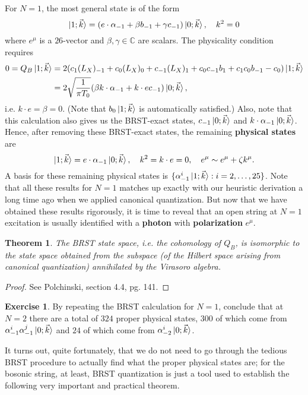 \documentclass{report}
\theoremstyle{plain}
\newtheorem{theorem}{Theorem}[section]
\theoremstyle{definition}
\newtheorem{exercise}{Exercise}[section]
\theoremstyle{remark}
\newcommand{\bC}{\mathbb{C}}
\begin{document}
For $N = 1$, the most general state is of the form
\[ \ket{1; \vec{k}} = (e \cdot \alpha_{-1} + \beta b_{-1} + \gamma c_{-1})\ket{0; \vec{k}}, \quad k^2 = 0 \]
where $e^\mu$ is a $26$-vector and $\beta, \gamma \in \bC$ are
scalars. The physicality condition requires
\begin{align*}
  0 = Q_B\ket{1; \vec{k}}
  &= 2(c_1(L_X)_{-1} + c_0(L_X)_0 + c_{-1}(L_X)_1 + c_0c_{-1}b_1 + c_1c_0 b_{-1} - c_0)\ket{1; \vec{k}} \\
  &= 2\sqrt{\frac{1}{\pi T_0}}(\beta k \cdot \alpha_{-1} + k \cdot e c_{-1}) \ket{0; \vec{k}},
\end{align*}
i.e. $k \cdot e = \beta = 0$. (Note that $b_0 \ket{1; \vec{k}}$ is
automatically satisfied.) Also, note that this calculation also gives
us the BRST-exact states, $c_{-1}\ket{0; \vec{k}}$ and $k \cdot
\alpha_{-1}\ket{0; \vec{k}}$. Hence, after removing these BRST-exact
states, the remaining {\bf physical states} are
\[ \ket{1; \vec{k}} = e \cdot \alpha_{-1} \ket{0; \vec{k}}, \quad k^2 = k \cdot e = 0, \quad e^\mu \sim e^\mu + \zeta k^\mu. \]
A basis for these remaining physical states is $\{\alpha_{-1}^i\ket{1;
  \vec{k}} : i = 2, \ldots, 25\}$. Note that all these results for $N
= 1$ matches up exactly with our heuristic derivation a long time ago
when we applied canonical quantization. But now that we have obtained
these results rigorously, it is time to reveal that an open string at
$N = 1$ excitation is usually identified with a {\bf photon} with {\bf
  polarization} $e^\mu$.

\begin{theorem}
  The BRST state space, i.e. the cohomology of $Q_B$, is isomorphic to
  the state space obtained from the subspace (of the Hilbert space
  arising from canonical quantization) annihilated by the Virasoro
  algebra.
\end{theorem}

\begin{proof}
  See Polchinski, section 4.4, pg. 141.
\end{proof}

\begin{exercise}
  By repeating the BRST calculation for $N = 1$, conclude that at $N =
  2$ there are a total of $324$ proper physical states, $300$ of which
  come from $\alpha_{-1}^i \alpha_{-1}^j \ket{0; \vec{k}}$ and $24$ of
  which come from $\alpha_{-2}^i\ket{0; \vec{k}}$.
\end{exercise}

It turns out, quite fortunately, that we do not need to go through the
tedious BRST procedure to actually find what the proper physical
states are; for the bosonic string, at least, BRST quantization is
just a tool used to establish the following very important and
practical theorem.
\end{document}
